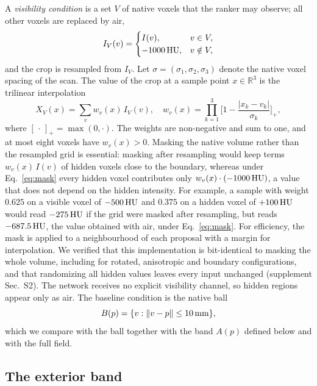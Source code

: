 A \emph{visibility condition} is a set $V$ of native voxels that the ranker may observe; all other voxels are replaced by air,
\begin{equation}
 I_V(v)=
 \begin{cases}
 I(v), & v\in V,\\
 -1000\,\mathrm{HU}, & v\notin V ,
 \end{cases}
 \label{eq:mask}
\end{equation}
and the crop is resampled from $I_V$. Let $\sigma=(\sigma_1,\sigma_2,\sigma_3)$ denote the native voxel spacing of the scan. The value of the crop at a sample point $x\in\mathbb{R}^3$ is the trilinear interpolation
\begin{equation}
 X_V(x)=\sum_{v} w_v(x)\,I_V(v),\quad
 w_v(x)=\prod_{k=1}^{3}\Big[1-\frac{|x_k-v_k|}{\sigma_k}\Big]_+ ,
 \label{eq:trilinear}
\end{equation}
where $[\,\cdot\,]_+=\max(0,\cdot)$. The weights are non-negative and sum to one, and at most eight voxels have $w_v(x)>0$. Masking the native volume rather than the resampled grid is essential: masking after resampling would keep terms $w_v(x)\,I(v)$ of hidden voxels close to the boundary, whereas under Eq.~\eqref{eq:mask} every hidden voxel contributes only $w_v(x)\cdot(-1000\,\mathrm{HU})$, a value that does not depend on the hidden intensity. For example, a sample with weight $0.625$ on a visible voxel of $-500\,\mathrm{HU}$ and $0.375$ on a hidden voxel of $+100\,\mathrm{HU}$ would read $-275\,\mathrm{HU}$ if the grid were masked after resampling, but reads $-687.5\,\mathrm{HU}$, the value obtained with air, under Eq.~\eqref{eq:mask}. For efficiency, the mask is applied to a neighbourhood of each proposal with a margin for interpolation. We verified that this implementation is bit-identical to masking the whole volume, including for rotated, anisotropic and boundary configurations, and that randomizing all hidden values leaves every input unchanged (supplement Sec.~S2). The network receives no explicit visibility channel, so hidden regions appear only as air. The baseline condition is the native ball
\begin{equation}
B(p)=\{v:\lVert v-p\rVert\le 10\,\mathrm{mm}\},
\end{equation}
which we compare with the ball together with the band $A(p)$ defined below and with the full field.

\subsection{The exterior band}
\label{sec:band}

